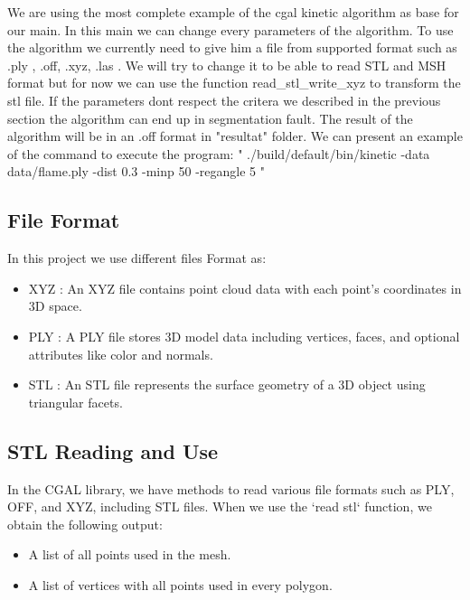 \documentclass{article}
\begin{document}
We are using the most complete example of the cgal kinetic algorithm as base for our main. In this main we can change every parameters of the algorithm.
\newline
To use the algorithm we currently need to give him a file from supported format such as .ply , .off, .xyz, .las .
We will try to change it to be able to read STL and MSH format but for now we can use the function read\_stl\_write\_xyz to transform the stl file.
If the parameters dont respect the critera we described in the previous section the algorithm can end up in segmentation fault.
The result of the algorithm will be in an .off format in "resultat" folder.
\newline
We can present an example of the command to execute the program:
\newline
" ./build/default/bin/kinetic -data data/flame.ply -dist 0.3 -minp 50 -regangle 5 "
\newline


\subsection{File Format}
In this project we use different files Format as: 

\begin{itemize}
  \item XYZ : An XYZ file contains point cloud data with each point's coordinates in 3D space.
  \item PLY : A PLY file stores 3D model data including vertices, faces, and optional attributes like color and normals.
  \item STL : An STL file represents the surface geometry of a 3D object using triangular facets.
  
\end{itemize}

\subsection{STL Reading and Use}

In the CGAL library, we have methods to read various file formats such as PLY, OFF, and XYZ, including STL files. When we use the `read stl` function, we obtain the following output:

\begin{itemize}
  \item A list of all points used in the mesh.
  \item A list of vertices with all points used in every polygon.
\end{itemize}
\end{document}
